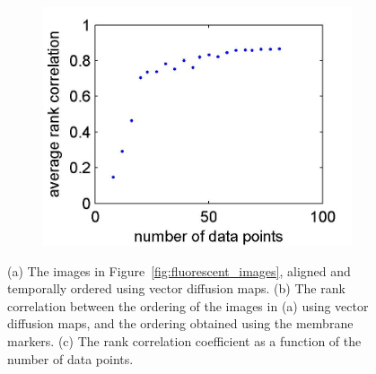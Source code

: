 \documentclass{pnastwo}
\begin{document}
\begin{figure}
\begin{minipage}{0.4\textwidth}
\begin{subfigure}{\textwidth}
\caption{}
\label{subfig:rank_corr}
\end{subfigure}
\begin{subfigure}{\textwidth}
\includegraphics[width=\textwidth]{bootstrap_rank_corr_color}
\caption{}
\label{subfig:bootstrap}
\end{subfigure}
\end{minipage}
\caption{(a) The images in Figure~\ref{fig:fluorescent_images}, aligned and temporally ordered using vector diffusion maps. (b) The rank correlation between the ordering of the images in (a) using vector diffusion maps, and the ordering obtained using the membrane markers. (c) The rank correlation coefficient as a function of the number of data points. }
\end{figure}
\end{document}

